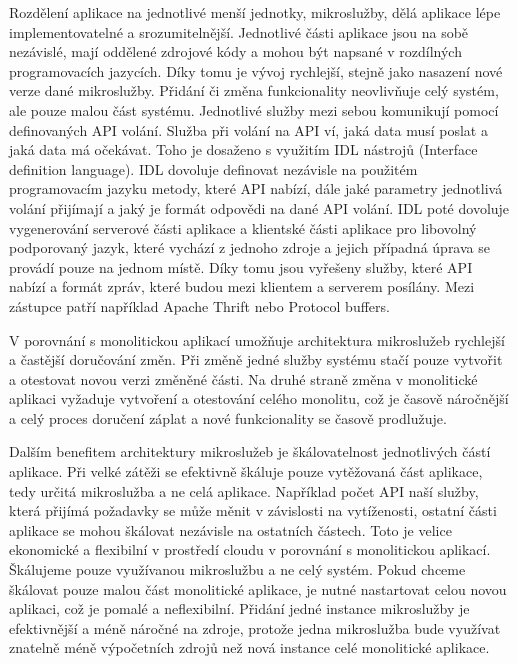     Rozdělení aplikace na jednotlivé menší jednotky, mikroslužby, dělá aplikace lépe implementovatelné a srozumitelnější. Jednotlivé části aplikace jsou na sobě nezávislé, mají oddělené zdrojové kódy a mohou být napsané v rozdílných programovacích jazycích. Díky tomu je vývoj rychlejší, stejně jako nasazení nové verze dané mikroslužby. Přidání či změna funkcionality neovlivňuje celý systém, ale pouze malou část systému. Jednotlivé služby mezi sebou komunikují pomocí definovaných API volání. Služba při volání na API ví, jaká data musí poslat a jaká data má očekávat. Toho je dosaženo s využitím IDL nástrojů (Interface definition language). IDL dovoluje definovat nezávisle na použitém programovacím jazyku metody, které API nabízí, dále jaké parametry jednotlivá volání přijímají a jaký je formát odpovědi na dané API volání. IDL poté dovoluje vygenerování serverové části aplikace a klientské části aplikace pro libovolný podporovaný jazyk, které vychází z jednoho zdroje a jejich případná úprava se provádí pouze na jednom místě. Díky tomu jsou vyřešeny služby, které API nabízí a formát zpráv, které budou mezi klientem a serverem posílány. Mezi zástupce patří například Apache Thrift \cite{sleethrift} nebo Protocol buffers. \par
    V porovnání s monolitickou aplikací umožňuje architektura mikroslužeb rychlejší a častější doručování změn. Při změně jedné služby systému stačí pouze vytvořit a otestovat novou verzi změněné části. Na druhé straně změna v monolitické aplikaci vyžaduje vytvoření a otestování celého monolitu, což je časově náročnější a celý proces doručení záplat a nové funkcionality se časově prodlužuje. \par
    Dalším benefitem architektury mikroslužeb je škálovatelnost jednotlivých částí aplikace. Při velké zátěži se efektivně škáluje pouze vytěžovaná část aplikace, tedy určitá mikroslužba a ne celá aplikace. Například počet API naší služby, která přijímá požadavky se může měnit v závislosti na vytíženosti, ostatní části aplikace se mohou škálovat nezávisle na ostatních částech. Toto je velice ekonomické a flexibilní v prostředí cloudu v porovnání s monolitickou aplikací. Škálujeme pouze využívanou mikroslužbu a ne celý systém. Pokud chceme škálovat pouze malou část monolitické aplikace, je nutné nastartovat celou novou aplikaci, což je pomalé a neflexibilní. Přidání jedné instance mikroslužby je efektivnější a méně náročné na zdroje, protože jedna mikroslužba bude využívat znatelně méně výpočetních zdrojů než nová instance celé monolitické aplikace. \par

